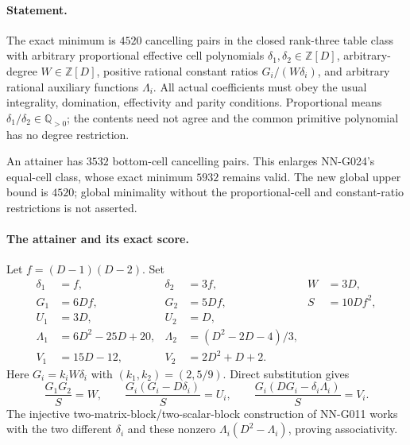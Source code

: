\paragraph{Statement.}
The exact minimum is $4520$ cancelling pairs in the closed
rank-three table class with arbitrary proportional effective
cell polynomials $\delta_1,\delta_2\in\mathbb Z[D]$,
arbitrary-degree $W\in\mathbb Z[D]$, positive rational
constant ratios $G_i/(W\delta_i)$, and arbitrary rational
auxiliary functions $\Lambda_i$. All actual coefficients
must obey the usual integrality, domination, effectivity
and parity conditions. Proportional means
$\delta_1/\delta_2\in\mathbb Q_{>0}$; the contents need
not agree and the common primitive polynomial has no
degree restriction.

An attainer has $3532$ bottom-cell cancelling pairs.
This enlarges NN-G024's equal-cell class, whose exact
minimum $5932$ remains valid. The new global upper
bound is $4520$; global minimality without the
proportional-cell and constant-ratio restrictions is
not asserted.

\paragraph{The attainer and its exact score.}
Let $f=(D-1)(D-2)$. Set
\[
 \begin{aligned}
 \delta_1&=f,&\delta_2&=3f,&W&=3D,\\
 G_1&=6Df,&G_2&=5Df,&S&=10Df^2,\\
 U_1&=3D,&U_2&=D,\\
 \Lambda_1&=6D^2-25D+20,&
 \Lambda_2&=(D^2-2D-4)/3,\\
 V_1&=15D-12,&V_2&=2D^2+D+2.
 \end{aligned}                                                     \tag{G025.1}
\]
Here $G_i=k_iW\delta_i$ with $(k_1,k_2)=(2,5/9)$.
Direct substitution gives
\[
 \frac{G_1G_2}{S}=W,\qquad
 \frac{G_i(G_i-D\delta_i)}{S}=U_i,\qquad
 \frac{G_i(DG_i-\delta_i\Lambda_i)}{S}=V_i.
\]
The injective two-matrix-block/two-scalar-block construction
of NN-G011 works with the two different $\delta_i$ and
these nonzero $\Lambda_i(D^2-\Lambda_i)$, proving
associativity.

